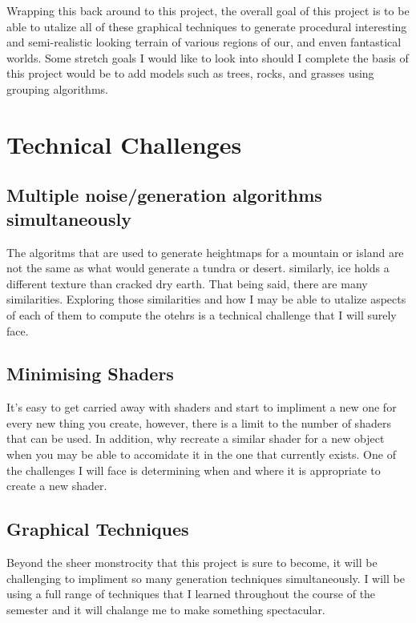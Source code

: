 \documentclass[12pt]{article}
\begin{document}
Wrapping this back around to this project, the overall goal of this project is to be able to utalize all of these 
graphical techniques to generate procedural interesting and semi-realistic looking terrain of various regions of our,
and enven fantastical worlds. Some stretch goals I would like to look into should I complete the basis of this project 
would be to add models such as trees, rocks, and grasses using grouping algorithms.

\section{Technical Challenges}
    \subsection{Multiple noise/generation algorithms simultaneously}
        The algoritms that are used to generate heightmaps for a mountain or island are not the same as what would 
        generate a tundra or desert. similarly, ice holds a different texture than cracked dry earth. That being said, there
        are many similarities. Exploring those similarities and how I may be able to utalize aspects of each of them to 
        compute the otehrs is a technical challenge that I will surely face.

    \subsection{Minimising Shaders}
        It's easy to get carried away with shaders and start to impliment a new one for every new thing you create,
        however, there is a limit to the number of shaders that can be used. In addition, why recreate a similar shader
        for a new object when you may be able to accomidate it in the one that currently exists. One of the challenges I will face
        is determining when and where it is appropriate to create a new shader.
 
    \subsection{Graphical Techniques}
        Beyond the sheer monstrocity that this project is sure to become, it will be challenging to impliment so many 
        generation techniques simultaneously. I will be using a full range of techniques that I learned throughout the course 
        of the semester and it will chalange me to make something spectacular.\\
        
\end{document}
